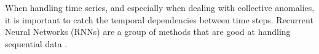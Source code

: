 When handling time series, and especially when dealing with collective anomalies, it is important to catch the temporal dependencies between time steps. Recurrent Neural Networks (RNNs) are a group of methods that are good at handling sequential data \cite{}.